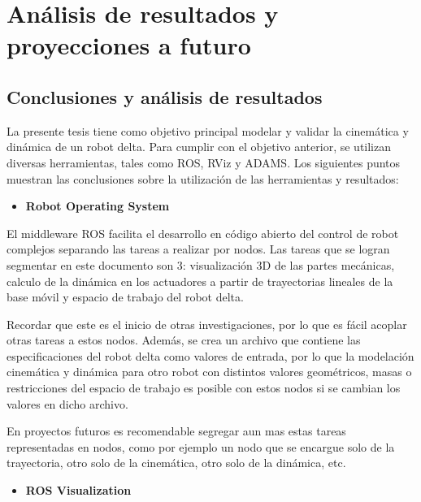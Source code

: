 \chapter{Análisis de resultados y proyecciones a futuro}\label{CAP8}

\section{Conclusiones y análisis de resultados}
        La presente tesis tiene como objetivo principal modelar y validar la cinemática y dinámica de un robot delta. Para cumplir con el objetivo anterior, se utilizan diversas herramientas, tales como ROS, RViz y ADAMS. Los siguientes puntos muestran las conclusiones sobre la utilización de las herramientas y resultados:

             \begin{itemize}
                 \item \textbf{Robot Operating System}
             \end{itemize}

            El middleware ROS facilita el desarrollo en código abierto del control de robot complejos separando las tareas a realizar por nodos. Las tareas que se logran segmentar en este documento son 3: visualización 3D de las partes mecánicas, calculo de la dinámica en los actuadores a partir de trayectorias lineales de la base móvil  y espacio de trabajo del robot delta. 
            
            Recordar que este es el inicio de otras investigaciones, por lo que es fácil acoplar otras tareas a estos nodos. Además, se crea un archivo que contiene las especificaciones del robot delta como valores de entrada, por lo que la modelación cinemática y dinámica para otro robot con distintos valores geométricos, masas o restricciones del espacio de trabajo es posible con estos nodos si se cambian los valores en dicho archivo.
            
            En proyectos futuros es recomendable segregar aun mas estas tareas representadas en nodos, como por ejemplo un nodo que se encargue solo de la trayectoria, otro solo de la cinemática, otro solo de la dinámica, etc.
            \vspace{1cm}
            
\newpage

             \begin{itemize}
                 \item  \textbf{ROS Visualization} 
             \end{itemize}
             

